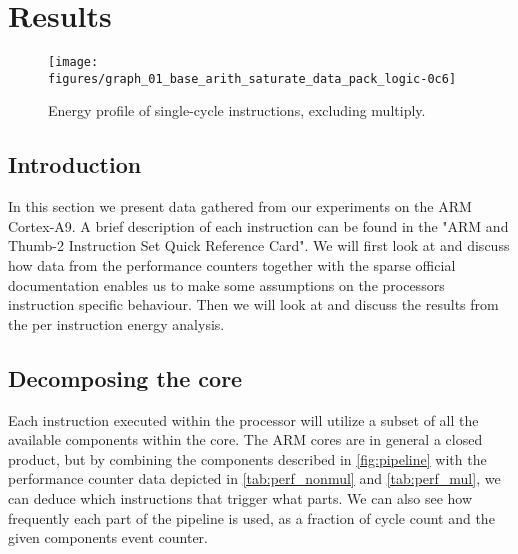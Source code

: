 \section{Results}

%
%
%
%

\begin{figure*}[ht]
    \centering
    \texttt{[image: figures/graph\_01\_base\_arith\_saturate\_data\_pack\_logic-0c6]}
    \caption{Energy profile of single-cycle instructions, excluding multiply.}
    \label{fig:singlecycle}
\end{figure*}

\subsection{Introduction}
In this section we present data gathered from our experiments on the ARM
Cortex-A9. A brief description of each instruction can be found in the "ARM and
Thumb-2 Instruction Set Quick Reference Card"\cite{armasmref}. We will first look at and discuss
how data from the performance counters together with the sparse official documentation
enables us to make some assumptions on the processors instruction specific behaviour. Then we
will look at and discuss the results from the per instruction energy analysis.

\subsection{Decomposing the core}
Each instruction executed within the processor will utilize a subset
of all the available components within the core. The ARM cores are in general a
closed product, but by combining the components described in
\autoref{fig:pipeline} with the performance counter data depicted in
\autoref{tab:perf_nonmul} and \autoref{tab:perf_mul}, we can deduce which
instructions that trigger what parts. We can also see how frequently each part
of the pipeline is used, as a fraction of cycle count and the given components
event counter.

